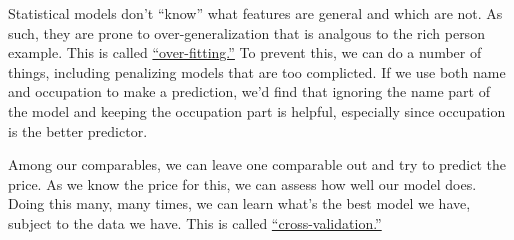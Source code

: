 \documentclass[
12pt, %
letterpaper, %
oneside, %
headinclude,footinclude, %
BCOR5mm, %
]{scrartcl}
\begin{document}
Statistical models don't ``know'' what features are general and which are not.
As such, they are prone to over-generalization that is analgous to the rich person example. 
This is called \href{https://en.wikipedia.org/wiki/Overfitting}{``over-fitting.''}
To prevent this, we can do a number of things, including penalizing models that are too complicted.
If we use both name and occupation to make a prediction, we'd find that ignoring the name part of the model and keeping the occupation part is helpful, especially since occupation is the better predictor. 

Among our comparables, we can leave one comparable out and try to predict the price.
As we know the price for this, we can assess how well our model does.
Doing this many, many times, we can learn what's the best model we have, subject to the data we have.
This is called \href{https://en.wikipedia.org/wiki/Cross-validation_(statistics)}{``cross-validation.''}

\end{document}
